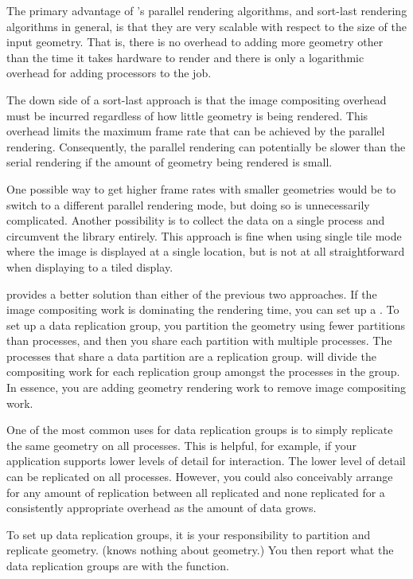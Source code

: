 The primary advantage of \IceT's parallel rendering algorithms, and
sort-last rendering algorithms in general, is that they are very scalable
with respect to the size of the input geometry.  That is, there is no
overhead to adding more geometry other than the time it takes hardware to
render and there is only a logarithmic overhead for adding processors to
the job.

The down side of a sort-last approach is that the image compositing
overhead must be incurred regardless of how little geometry is being
rendered.  This overhead limits the maximum frame rate that can be achieved
by the parallel rendering.  Consequently, the parallel rendering can
potentially be slower than the serial rendering if the amount of geometry
being rendered is small.

One possible way to get higher frame rates with smaller geometries would be
to switch to a different parallel rendering mode, but doing so is
unnecessarily complicated.  Another possibility is to collect the data on
a single process and circumvent the \IceT library entirely.  This approach
is fine when using single tile mode where the image is displayed at a
single location, but is not at all straightforward when displaying to a
tiled display.

\IceT provides a better solution than either of the previous two
approaches.  If the image compositing work is dominating the rendering
time, you can set up a .  To set up a data
replication group, you partition the geometry using fewer partitions than
processes, and then you share each partition with multiple processes.  The
processes that share a data partition are a replication group.  \IceT will
divide the compositing work for each replication group amongst the
processes in the group.  In essence, you are adding geometry rendering work
to remove image compositing work.

One of the most common uses for data replication groups is to simply
replicate the same geometry on all processes.  This is helpful, for
example, if your application supports lower levels of detail for
interaction.  The lower level of detail can be replicated on all
processes.  However, you could also conceivably arrange for any amount of
replication between all replicated and none replicated for a consistently
appropriate overhead as the amount of data grows.

To set up data replication groups, it is your responsibility to partition
and replicate geometry.  (\IceT knows nothing about geometry.)  You then
report what the data replication groups are with the
 function.

